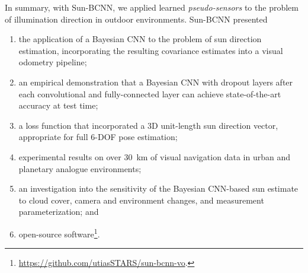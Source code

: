 In summary, with Sun-BCNN, we applied learned \textit{pseudo-sensors} to the problem of illumination direction in outdoor environments. Sun-BCNN presented
\begin{enumerate}
\item the application of a Bayesian CNN to the problem of sun direction estimation, incorporating the resulting covariance estimates into a visual odometry pipeline; 
\item an empirical demonstration that a Bayesian CNN with dropout layers after each convolutional and fully-connected layer can achieve state-of-the-art accuracy at test time;
\item a loss function that incorporated a 3D unit-length sun direction vector, appropriate for full 6-DOF pose estimation;
\item experimental results on over 30~km of visual navigation data in urban \citep{Geiger2013-ky} and planetary analogue \citep{Furgale2012-kk} environments; 
\item an investigation into the sensitivity of the Bayesian CNN-based sun estimate to cloud cover, camera and environment changes, and measurement parameterization; and
\item open-source software\footnote{\url{https://github.com/utiasSTARS/sun-bcnn-vo}.}.
\end{enumerate}

